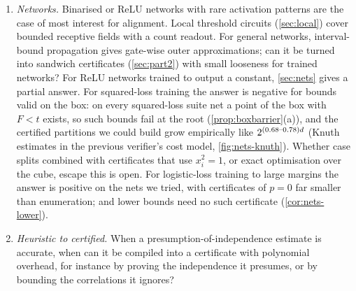 \begin{enumerate}
pseudo-tree depth.
\item \emph{Networks.} Binarised or ReLU networks with rare activation patterns
are the case of most interest for alignment. Local threshold circuits
(\cref{sec:local}) cover bounded receptive fields with a count readout. For general
networks, interval-bound propagation gives gate-wise outer approximations; can it be
turned into sandwich certificates (\cref{sec:part2}) with small looseness for trained
networks? For ReLU networks trained to output a constant, \cref{sec:nets} gives a
partial answer. For squared-loss training the answer is negative for bounds valid on
the box: on every squared-loss suite net a point of the box with $F<t$ exists, so such
bounds fail at the root (\cref{prop:boxbarrier}(a)), and the certified partitions we
could build grow empirically like $2^{(0.68\text{--}0.78)d}$ (Knuth estimates in the
previous verifier's cost model, \cref{fig:nets-knuth}). Whether case splits combined with certificates that use
$x_i^2=1$, or exact optimisation over the cube, escape this is open. For
logistic-loss training to large margins the answer is positive on the nets we tried,
with certificates of $p=0$ far smaller than enumeration; and lower bounds need no such certificate
(\cref{cor:nets-lower}).
\item \emph{Heuristic to certified.} When a presumption-of-independence estimate
is accurate, when can it be compiled into a certificate with polynomial overhead,
for instance by proving the independence it presumes, or by bounding the
correlations it ignores?
\end{enumerate}
